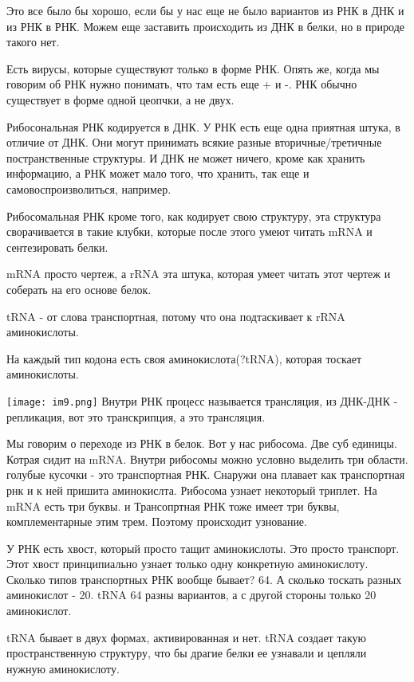 Это все было бы хорошо, если бы у нас 
еще не было вариантов из РНК в ДНК и из РНК в РНК. Можем
еще заставить происходить из ДНК в белки, но в природе такого нет.

Есть вирусы, которые существуют только в форме РНК. Опять же,
когда мы говорим об РНК нужно понимать, что там есть еще + и -. РНК
обычно существует в форме одной цеопчки, а не двух.

Рибосональная РНК кодируется в ДНК. У РНК есть
еще одна приятная штука, в отличие от ДНК. Они могут
принимать всякие разные вторичные/третичные постранственные структуры.
И ДНК не может ничего, кроме как хранить информацию, а РНК может
мало того, что хранить, так еще и самовоспроизволиться, например.

Рибосомальная РНК кроме того, как кодирует свою структуру, эта структура 
сворачивается в такие клубки, которые после этого умеют 
читать mRNA и сентезировать белки.

mRNA просто чертеж, а rRNA эта штука, которая умеет читать этот чертеж и соберать
на его основе белок.

tRNA - от слова транспортная, потому что она подтаскивает к rRNA аминокислоты.

На каждый тип кодона есть своя аминокислота(?tRNA), которая тоскает аминокислоты. 

\texttt{[image: im9.png]}
Внутри РНК процесс называется трансляция, из ДНК-ДНК - репликация, 
вот это транскрипция, а это трансляция.

Мы говорим о переходе из РНК в белок. Вот у нас рибосома. Две суб единицы.
Котрая сидит на mRNA. Внутри рибосомы можно условно выделить
три области. голубые кусочки - это транспортная РНК. Снаружи она плавает
как транспортная рнк и к ней пришита аминокислта. Рибосома узнает
некоторый триплет. На mRNA есть три буквы. и Трансопртная РНК тоже имеет
три буквы, комплементарные этим трем. Поэтому происходит узнование.

У РНК есть хвост, который просто тащит аминокислоты. Это просто транспорт. Этот
хвост принципиально узнает только одну конкретную аминокислоту. Сколько типов
транспортных РНК вообще бывает? 64. А сколько тоскать разных аминокислот - 20.
tRNA 64 разны вариантов, а с другой стороны только 20 аминокислот.

tRNA бывает в двух формах, активированная и нет. tRNA создает такую пространственную
структуру, что бы драгие белки ее узнавали и цепляли нужную аминокислоту.

